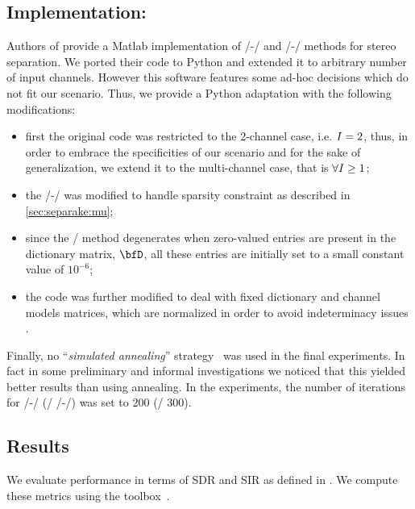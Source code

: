 \subsection{Implementation:}
Authors of  provide a Matlab implementation of \MU/-\NMF/ and \EM/-\NMF/ methods for stereo separation.
We ported their code to Python and extended it to arbitrary number of input channels.
However this software features some ad-hoc decisions which do not fit our scenario.
Thus, we provide a Python adaptation with the following modifications:
\begin{itemize}
    \item first the original code was restricted to the 2-channel case, i.e.  $I = 2$,
    thus, in order to embrace the specificities of our scenario and for the sake of generalization, we extend it to the multi-channel case, that is $\forall I \geq 1$;
    \item the \MU/-\NMF/ was modified to handle sparsity constraint as described in \ref{sec:separake:mu};
    \item since the \EM/ method degenerates when zero-valued entries are present in the dictionary matrix, $\mD$, all these entries are initially set to a small constant value of $10^{-6}$;
    \item the code was further modified to deal with fixed dictionary and channel models matrices, which are normalized in order to avoid indeterminacy issues .
\end{itemize}
Finally, no ``\textit{simulated annealing}'' strategy~ was used in the final experiments.
In fact in some preliminary and informal investigations we noticed that this yielded better results than using annealing.
In the experiments, the number of iterations for \MU/-\NMF/ (\resp/ \EM/-\NMF/) was set to 200 (\resp/ 300).

\subsection{Results}
\label{sec:results}

We evaluate performance in terms of \ac{SDR} and \ac{SIR} as defined in .
We compute these metrics using the  toolbox~.

